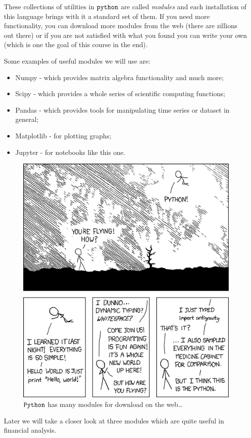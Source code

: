 These collections of utilities in \(\tt{python}\) are called \emph{modules} and each installation of this language brings with it a standard set of them. If you need more functionality, you can download more modules from the web (there are zillions out there) or if you are not satisfied with what you found you can write your own (which is one the goal of this course in the end).

Some examples of useful modules we will use are:

\begin{itemize}
\tightlist
\item
  Numpy - which provides matrix algebra functionality and much more;
\item
  Scipy - which provides a whole series of scientific computing
  functions;
\item
  Pandas - which provides tools for manipulating time series or dataset
  in general;
\item
  Matplotlib - for plotting graphs;
\item
  Jupyter - for notebooks like this one.
\end{itemize}

\begin{figure}
\centering
\includegraphics[width=0.75\linewidth]{python.png}
\caption{$\tt{Python}$ has many modules for download on the web\ldots{}}
\end{figure}

Later we will take a closer look at three modules which are quite useful in financial analysis.

